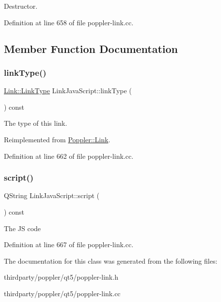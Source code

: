 Destructor. 

Definition at line 658 of file poppler-\/link.\+cc.



\subsection{Member Function Documentation}
\mbox{\label{class_poppler_1_1_link_java_script_a4fda2a64f798cdec7fffc0a8061c4cd1}} 
\subsubsection{\texorpdfstring{link\+Type()}{linkType()}}
{\footnotesize\ttfamily \hyperlink{class_poppler_1_1_link_af0dacfa77a548bb043dbae4bb9dc6c1e}{Link\+::\+Link\+Type} Link\+Java\+Script\+::link\+Type (\begin{DoxyParamCaption}{ }\end{DoxyParamCaption}) const\hspace{0.3cm}{\ttfamily [virtual]}}

The type of this link. 

Reimplemented from \hyperlink{class_poppler_1_1_link_a3e3ad7e8867e255c24b9a562bad596ed}{Poppler\+::\+Link}.



Definition at line 662 of file poppler-\/link.\+cc.

\mbox{\label{class_poppler_1_1_link_java_script_ab6211e681dda8fcf1de022cb245fc5b2}} 
\subsubsection{\texorpdfstring{script()}{script()}}
{\footnotesize\ttfamily Q\+String Link\+Java\+Script\+::script (\begin{DoxyParamCaption}{ }\end{DoxyParamCaption}) const}

The JS code 

Definition at line 667 of file poppler-\/link.\+cc.



The documentation for this class was generated from the following files\+:\begin{DoxyCompactItemize}
\item 
thirdparty/poppler/qt5/poppler-\/link.\+h\item 
thirdparty/poppler/qt5/poppler-\/link.\+cc\end{DoxyCompactItemize}
